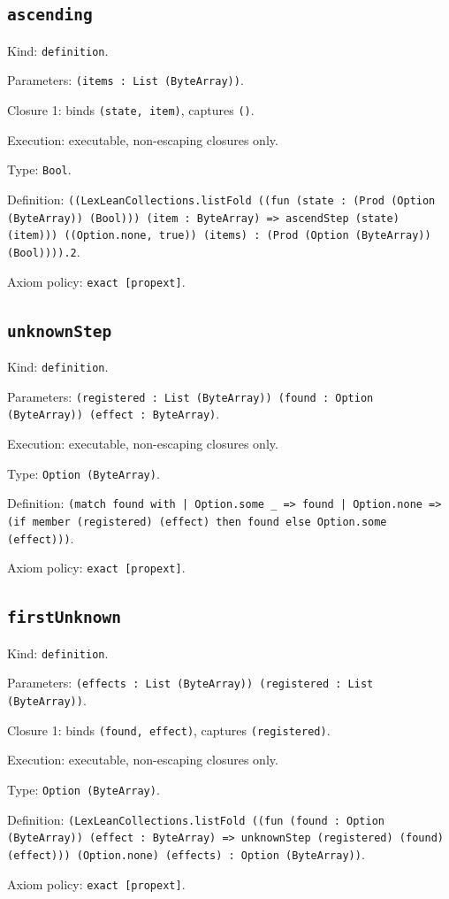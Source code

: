 \documentclass[11pt]{article}
\begin{document}
\subsection*{\texttt{ascending}}
\noindent Kind: \texttt{definition}.\par
\noindent Parameters: \texttt{(items : List (ByteArray))}.\par
\noindent Closure 1: binds \texttt{(state, item)}, captures \texttt{()}.\par
\noindent Execution: executable, non-escaping closures only.\par
\noindent Type: \texttt{Bool}.\par
\noindent Definition: \texttt{((LexLeanCollections.listFold ((fun (state : (Prod (Option (ByteArray)) (Bool))) (item : ByteArray) => ascendStep (state) (item))) ((Option.none, true)) (items) : (Prod (Option (ByteArray)) (Bool)))).2}.\par
\noindent Axiom policy: \texttt{exact [propext]}.\par
\subsection*{\texttt{unknownStep}}
\noindent Kind: \texttt{definition}.\par
\noindent Parameters: \texttt{(registered : List (ByteArray)) (found : Option (ByteArray)) (effect : ByteArray)}.\par
\noindent Execution: executable, non-escaping closures only.\par
\noindent Type: \texttt{Option (ByteArray)}.\par
\noindent Definition: \texttt{(match found with | Option.some \_ => found | Option.none => (if member (registered) (effect) then found else Option.some (effect)))}.\par
\noindent Axiom policy: \texttt{exact [propext]}.\par
\subsection*{\texttt{firstUnknown}}
\noindent Kind: \texttt{definition}.\par
\noindent Parameters: \texttt{(effects : List (ByteArray)) (registered : List (ByteArray))}.\par
\noindent Closure 1: binds \texttt{(found, effect)}, captures \texttt{(registered)}.\par
\noindent Execution: executable, non-escaping closures only.\par
\noindent Type: \texttt{Option (ByteArray)}.\par
\noindent Definition: \texttt{(LexLeanCollections.listFold ((fun (found : Option (ByteArray)) (effect : ByteArray) => unknownStep (registered) (found) (effect))) (Option.none) (effects) : Option (ByteArray))}.\par
\noindent Axiom policy: \texttt{exact [propext]}.\par
\end{document}
